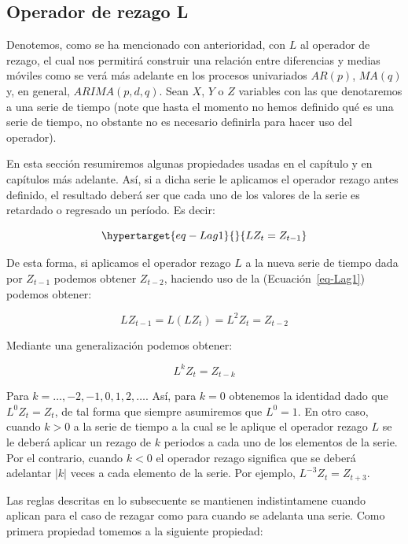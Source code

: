 \documentclass[
  a4paper,
]{article}
\begin{document}
\hypertarget{operador-de-rezago-l}{%
\subsection{Operador de rezago L}\label{operador-de-rezago-l}}

Denotemos, como se ha mencionado con anterioridad, con \(L\) al operador
de rezago, el cual nos permitirá construir una relación entre
diferencias y medias móviles como se verá más adelante en los procesos
univariados \(AR(p)\), \(MA(q)\) y, en general, \(ARIMA(p, d, q)\). Sean
\(X\), \(Y\) o \(Z\) variables con las que denotaremos a una serie de
tiempo (note que hasta el momento no hemos definido qué es una serie de
tiempo, no obstante no es necesario definirla para hacer uso del
operador).

En esta sección resumiremos algunas propiedades usadas en el capítulo y
en capítulos más adelante. Así, si a dicha serie le aplicamos el
operador rezago antes definido, el resultado deberá ser que cada uno de
los valores de la serie es retardado o regresado un período. Es decir:

\begin{equation}\protect\hypertarget{eq-Lag1}{}{
L Z_t = Z_{t-1}
}\label{eq-Lag1}\end{equation}

De esta forma, si aplicamos el operador rezago \(L\) a la nueva serie de
tiempo dada por \(Z_{t-1}\) podemos obtener \(Z_{t-2}\), haciendo uso de
la (Ecuación~\ref{eq-Lag1}) podemos obtener:

\[
L Z_{t-1} = L(L Z_t) = L^2 Z_t = Z_{t-2}
\]

Mediante una generalización podemos obtener:

\[
L^k Z_t = Z_{t-k}
\]

Para \(k = \ldots, -2, -1, 0, 1, 2, \ldots\). Así, para \(k = 0\)
obtenemos la identidad dado que \(L^0 Z_t = Z_t\), de tal forma que
siempre asumiremos que \(L^0 = 1\). En otro caso, cuando \(k > 0\) a la
serie de tiempo a la cual se le aplique el operador rezago \(L\) se le
deberá aplicar un rezago de \(k\) periodos a cada uno de los elementos
de la serie. Por el contrario, cuando \(k < 0\) el operador rezago
significa que se deberá adelantar \(|k|\) veces a cada elemento de la
serie. Por ejemplo, \(L^{-3} Z_t = Z_{t+3}\).

Las reglas descritas en lo subsecuente se mantienen indistintamene
cuando aplican para el caso de rezagar como para cuando se adelanta una
serie. Como primera propiedad tomemos a la siguiente propiedad:
\end{document}
